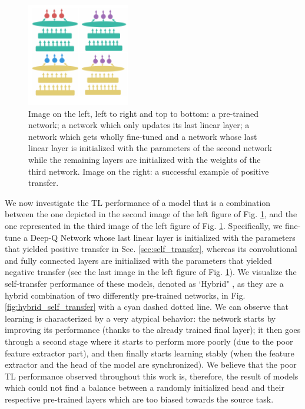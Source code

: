 \begin{figure}[ht]
\begin{minipage}{0.5\textwidth}
	\centering
\includegraphics[width=4.5cm]{./Images/Chapter08/networks_.pdf}
\end{minipage}%
\begin{minipage}{0.5\textwidth}
	\centering
	
\end{minipage}
\caption{Image on the left, left to right and top to bottom: a pre-trained network; a network which only updates its last linear layer; a network which gets wholly fine-tuned and a network whose last linear layer is initialized with the parameters of the second network while the remaining layers are initialized with the weights of the third network. Image on the right: a successful example of positive transfer.}
\label{fig:networks}
\end{figure}

We now investigate the TL performance of a model that is a combination between the one depicted in the second image of the left figure of Fig. \ref{fig:networks}, and the one represented in the third image of the left figure of Fig. \ref{fig:networks}. Specifically, we fine-tune a Deep-Q Network whose last linear layer is initialized with the parameters that yielded positive transfer in Sec. \ref{sec:self_transfer}, whereas its convolutional and fully connected layers are initialized with the parameters that yielded negative transfer (see the last image in the left figure of Fig. \ref{fig:networks}). We visualize the self-transfer performance of these models, denoted as `Hybrid" , as they are a hybrid combination of two differently pre-trained networks, in Fig. \ref{fig:hybrid_self_transfer} with a cyan dashed dotted line. We can observe that learning is characterized by a very atypical behavior: the network starts by improving its performance (thanks to the already trained final layer); it then goes through a second stage where it starts to perform more poorly (due to the poor feature extractor part), and then finally starts learning stably (when the feature extractor and the head of the model are synchronized). We believe that the poor TL performance observed throughout this work is, therefore, the result of models which could not find a balance between a randomly initialized head and their respective pre-trained layers which are too biased towards the source task.   

